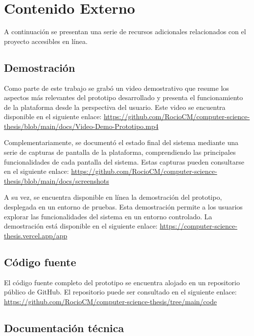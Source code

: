 \chapter[Contenido externo]{Contenido Externo}
\label{cp:annex-content}

\parindent0pt

A continuación se presentan una serie de recursos adicionales relacionados con el proyecto accesibles en línea.

\section{Demostración}
\label{sec:results-demo}

Como parte de este trabajo se grabó un video demostrativo que resume los aspectos más relevantes del prototipo desarrollado y presenta el funcionamiento de la plataforma desde la perspectiva del usuario. Este video se encuentra disponible en el siguiente enlace: 
\url{https://github.com/RocioCM/computer-science-thesis/blob/main/docs/Video-Demo-Prototipo.mp4}

Complementariamente, se documentó el estado final del sistema mediante una serie de capturas de pantalla de la plataforma, comprendiendo las principales funcionalidades de cada pantalla del sistema. Estas capturas pueden consultarse en el siguiente enlace: \url{https://github.com/RocioCM/computer-science-thesis/blob/main/docs/screenshots}

A su vez, se encuentra disponible en línea la demostración del prototipo, desplegada en un entorno de pruebas. Esta demostración permite a los usuarios explorar las funcionalidades del sistema en un entorno controlado. La demostración está disponible en el siguiente enlace: \url{https://computer-science-thesis.vercel.app/app}

\section{Código fuente}
\label{sec:source-code}

El código fuente completo del prototipo se encuentra alojado en un repositorio público de GitHub. El repositorio puede ser consultado en el siguiente enlace: \url{https://github.com/RocioCM/computer-science-thesis/tree/main/code}

\section{Documentación técnica}
\label{sec:technical-docs}

